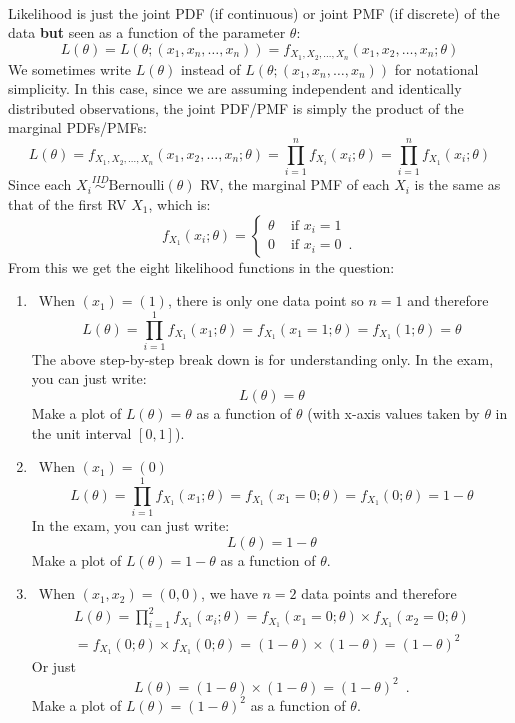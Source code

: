 \begin{Answer}
~\\
Likelihood is just the joint PDF (if continuous) or joint PMF (if discrete) of the data {\bf but} seen as a function of the parameter $\theta$: 
\[
L(\theta)=L(\theta; (x_1,x_n,\ldots,x_n)) = f_{X_1,X_2,\ldots,X_n}(x_1,x_2,\ldots,x_n; \theta)
\]
We sometimes write $L(\theta)$ instead of $L(\theta; (x_1,x_n,\ldots,x_n))$ for notational simplicity.  
In this case, since we are assuming independent and identically distributed observations, the joint PDF/PMF is simply the product of the marginal PDFs/PMFs:
\[
L(\theta) = f_{X_1,X_2,\ldots,X_n}(x_1,x_2,\ldots,x_n; \theta) = \prod_{i=1}^n f_{X_i}(x_i;\theta) = \prod_{i=1}^n f_{X_1}(x_i;\theta)
\]
Since each $X_i \overset{IID}{\sim} \mathrm{Bernoulli}(\theta)$ RV, the marginal PMF of each $X_i$ is the same as that of the first RV $X_1$, which is:
\[
f_{X_1}(x_i; \theta) 
= 
\begin{cases}
\theta & \text{ if } x_i = 1\\
0 & \text{ if } x_i=0 \enspace.
\end{cases}
\]
From this we get the eight likelihood functions in the question:
\begin{enumerate}
\item~When $(x_1)=(1)$, there is only one data point so $n=1$ and therefore
$$L(\theta)= \prod_{i=1}^1 f_{X_1}(x_1;\theta) = f_{X_1}(x_1=1;\theta) = f_{X_1}(1;\theta)=\theta$$
The above step-by-step break down is for understanding only.  In the exam, you can just write:
$$L(\theta)= \theta$$
Make a plot of $L(\theta)=\theta$ as a function of $\theta$ (with x-axis values taken by $\theta$ in the unit interval $[0,1]$).
\item~When $(x_1)=(0)$
$$L(\theta)= \prod_{i=1}^1 f_{X_1}(x_1;\theta) = f_{X_1}(x_1=0;\theta) = f_{X_1}(0;\theta)=1-\theta$$
In the exam, you can just write:
$$L(\theta)= 1-\theta$$
Make a plot of $L(\theta)=1-\theta$ as a function of $\theta$.
\item~When $(x_1,x_2)=(0,0)$, we have $n=2$ data points and therefore
\begin{multline*}
L(\theta)= \prod_{i=1}^2 f_{X_1}(x_i;\theta) = f_{X_1}(x_1=0;\theta) \times f_{X_1}(x_2=0;\theta) \\
= f_{X_1}(0;\theta)\times f_{X_1}(0;\theta) =(1-\theta) \times (1-\theta) = (1-\theta)^2
\end{multline*}
Or just
\[
L(\theta) = (1-\theta) \times (1-\theta) = (1-\theta)^2 \enspace .
\]
Make a plot of $L(\theta)=(1-\theta)^2$ as a function of $\theta$.

\end{enumerate}
\end{Answer}
